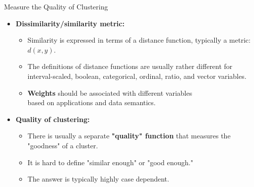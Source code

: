 \begin{frame}{Measure the Quality of Clustering}
	\begin{itemize}
		\item \textbf{Dissimilarity/similarity metric:}
		      \begin{itemize}
			      \item Similarity is expressed in terms of a distance function,
			            typically a metric: $d(x,y)$.
			      \item The definitions of distance functions are usually rather
			            different for interval-scaled, boolean, categorical, ordinal,
			            ratio, and vector variables.
			      \item \textbf{\color{airforceblue}Weights} should be associated
			            with different variables \\
			            based on applications and data semantics.
		      \end{itemize}
		\item \textbf{Quality of clustering:}
		      \begin{itemize}
			      \item There is usually a separate
			            \textbf{\color{airforceblue}"quality" function} that measures the
			            "goodness" of a cluster.
			      \item It is hard to define "similar enough" or "good enough."
			      \item The answer is typically highly case dependent.
		      \end{itemize}
	\end{itemize}
\end{frame}

